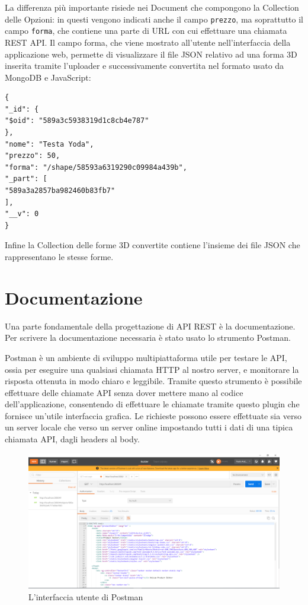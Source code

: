 La differenza più importante risiede nei Document che compongono la Collection delle Opzioni: in questi vengono indicati anche il campo \texttt{prezzo}, ma soprattutto il campo \texttt{forma}, che contiene una parte di URL con cui effettuare una chiamata REST API. Il campo forma, che viene mostrato all'utente nell'interfaccia della applicazione web, permette di visualizzare il file JSON relativo ad una forma 3D inserita tramite l'uploader e successivamente convertita nel formato usato da MongoDB e JavaScript:
\begin{lstlisting}[caption={Option Collection}, style=javaScriptCode]
{
"_id": {
"$oid": "589a3c5938319d1c8cb4e787"
},
"nome": "Testa Yoda",
"prezzo": 50,
"forma": "/shape/58593a6319290c09984a439b",
"_part": [
"589a3a2857ba982460b83fb7"
],
"__v": 0
}
\end{lstlisting}

Infine la Collection delle forme 3D convertite contiene l'insieme dei file JSON che rappresentano le stesse forme.

\section{Documentazione}
Una parte fondamentale della progettazione di API REST è la documentazione.
Per scrivere la documentazione necessaria è stato usato lo strumento Postman.

Postman è un ambiente di sviluppo multipiattaforma utile per testare le API, ossia per eseguire una qualsiasi chiamata HTTP al nostro server, e monitorare la risposta ottenuta in modo chiaro e leggibile. 
Tramite questo strumento è possibile effettuare delle chiamate API senza dover mettere mano al codice dell’applicazione, consentendo di effettuare le chiamate tramite questo plugin che fornisce un’utile interfaccia grafica. Le richieste possono essere effettuate sia verso un server locale che verso un server online impostando tutti i dati di una tipica chiamata API, dagli headers al body.
\begin{figure}[h]
	\centering
	\includegraphics[scale=0.35]{Immagini/postman_ui.png}
	\caption{L'interfaccia utente di Postman}
\end{figure}

